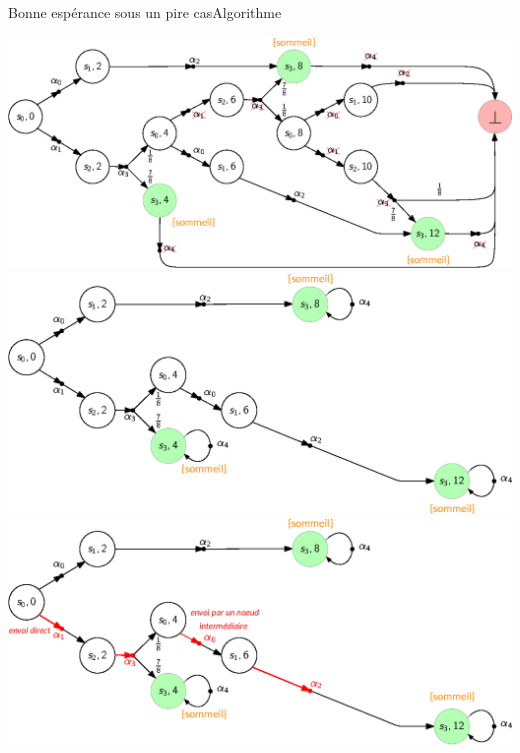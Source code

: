 \documentclass[compress]{beamer}
\theoremstyle{theorem}%
\begin{document}
\begin{frame}{Bonne espérance sous un pire cas}{Algorithme}
\begin{overprint}
        \includegraphics[width=\linewidth]{resources/example-unfoldingA}
      \includegraphics[width=0.95\linewidth]{resources/example-unfoldingA2}
      \includegraphics[width=0.95\linewidth]{resources/example-unfoldingAnew}
    \end{overprint}
\end{frame}
\end{document}
